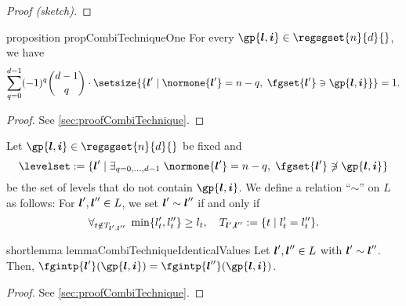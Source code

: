 \begin{proof}[Proof (sketch)]
  \blindtext{}
\end{proof}

\begin{restatable}{%
  proposition%
}{%
  propCombiTechniqueOne%
}
  \label{prop:combiTechniqueOne}
  For every $\gp{\*l,\*i} \in \regsgset{n}{d}{}$, we have
  \begin{equation}
    \label{eq:combiTechniqueOne}
    \sum_{q=0}^{d-1} (-1)^q \binom{d-1}{q} \cdot
    \setsize{
      \{\*l' \mid \normone{\*l'} = n - q,\; \fgset{\*l'} \ni \gp{\*l,\*i}\}
    }
    = 1.
  \end{equation}
\end{restatable}

\begin{proof}
  See \cref{sec:proofCombiTechnique}.
\end{proof}

\begin{definition}
  \label{def:combiTechniqueEquivalenceRelation}
  Let $\gp{\*l,\*i} \in \regsgset{n}{d}{}$ be fixed and
  \begin{equation}
    \label{eq:combiTechniqueSpecialLevelSet}
    \levelset
    := \{\*l' \mid \ex{q=0,\dotsc,d-1}{
      \normone{\*l'} = n - q,\; \fgset{\*l'} \notni \gp{\*l,\*i}
    }\}
  \end{equation}
  be the set of levels that do not contain $\gp{\*l,\*i}$.
  We define a relation ``$\sim$'' on $L$ as follows:
  For ${\boldsymbol{l}}', {\boldsymbol{l}}'' \in L$, we set ${\boldsymbol{l}}' \sim {\boldsymbol{l}}''$ if and only if
  \begin{equation}
    \forall_{t \notin T_{{\boldsymbol{l}}',{\boldsymbol{l}}''}}\;\min\{l'_t, l''_t\} \ge l_t,\quad
    T_{{\boldsymbol{l}}',{\boldsymbol{l}}''}
    := \{t \mid l'_t = l''_t\}.
  \end{equation}
\end{definition}

\begin{restatable}{%
  shortlemma%
}{%
  lemmaCombiTechniqueIdenticalValues%
}
  \label{lemma:combiTechniqueIdenticalValues}
  Let ${\boldsymbol{l}}', {\boldsymbol{l}}'' \in L$ with ${\boldsymbol{l}}' \sim {\boldsymbol{l}}''$.
  Then, $\fgintp{\*l'}(\gp{\*l,\*i})
  = \fgintp{\*l''}(\gp{\*l,\*i})$.
\end{restatable}

\begin{proof}
  See \cref{sec:proofCombiTechnique}.
\end{proof}


